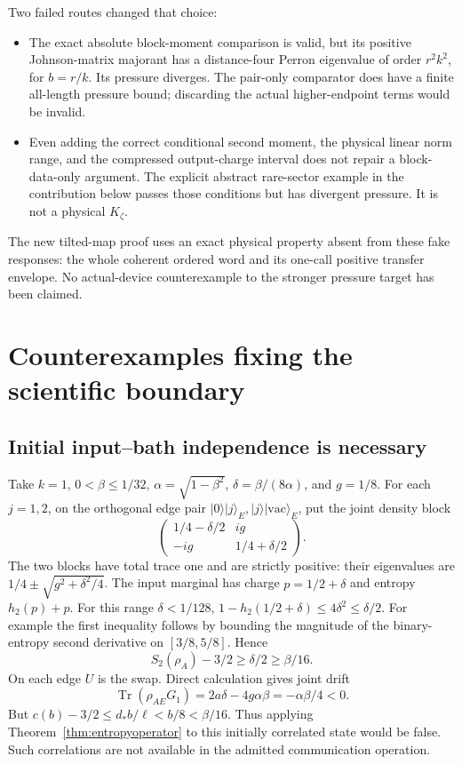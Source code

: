 \documentclass[11pt]{article}
\newcommand{\Tr}{\operatorname{Tr}}
\newcommand{\ket}[1]{\lvert #1\rangle}
\begin{document}
Two failed routes changed that choice:
\begin{itemize}
\item The exact absolute block-moment comparison is valid, but its
positive Johnson-matrix majorant has a distance-four Perron eigenvalue
of order \(r^2k^2\), for \(b=r/k\). Its pressure diverges.
The pair-only comparator does have a finite all-length pressure bound;
discarding the actual higher-endpoint terms would be invalid.
\item Even adding the correct conditional second moment, the physical
linear norm range, and the compressed output-charge interval does not
repair a block-data-only argument. The explicit abstract rare-sector
example in the contribution below passes those conditions but has
divergent pressure. It is not a physical \(K_\zeta\).
\end{itemize}
The new tilted-map proof uses an exact physical property absent from
these fake responses: the whole coherent ordered word and its one-call
positive transfer envelope. No actual-device counterexample to the
stronger pressure target has been claimed.

\section{Counterexamples fixing the scientific boundary}
\label{sec:counterexamples}

\subsection{Initial input--bath independence is necessary}

Take \(k=1\), \(0<\beta\le1/32\), \(\alpha=\sqrt{1-\beta^2}\),
\(\delta=\beta/(8\alpha)\), and \(g=1/8\).
For each \(j=1,2\), on the orthogonal edge pair
\(\ket0\ket j_E,\ket j\ket{\mathrm{vac}}_E\), put the joint density block
\[
 \begin{pmatrix}1/4-\delta/2&ig\\-ig&1/4+\delta/2\end{pmatrix}.
\]
The two blocks have total trace one and are strictly positive:
their eigenvalues are \(1/4\pm\sqrt{g^2+\delta^2/4}\).
The input marginal has charge \(p=1/2+\delta\) and entropy
\(h_2(p)+p\).
For this range \(\delta<1/128\),
\(1-h_2(1/2+\delta)\le4\delta^2\le\delta/2\).
For example the first inequality follows by bounding the magnitude of
the binary-entropy second derivative on \([3/8,5/8]\).
Hence
\[
 S_2(\rho_A)-3/2\ge\delta/2\ge\beta/16.
\]
On each edge \(U\) is the swap. Direct calculation gives joint drift
\[
 \Tr(\rho_{AE}G_1)=2a\delta-4g\alpha\beta
 =-\alpha\beta/4<0.
\]
But \(c(b)-3/2\le d_*b/\ell<b/8<\beta/16\).
Thus applying Theorem~\ref{thm:entropyoperator} to this initially
correlated state would be false. Such correlations are not available
in the admitted communication operation.
\end{document}
